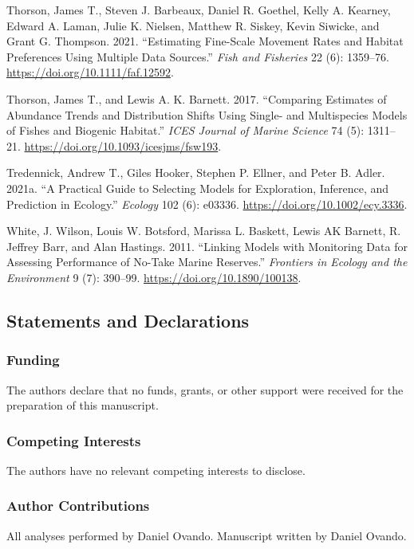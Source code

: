 \documentclass[
  default,
  lineno,
  referee]{sn-jnl}
\newlength{\cslhangindent}
\newenvironment{CSLReferences}[2] %
 {\begin{list}{}{%
  \setlength{\itemindent}{0pt}
  \setlength{\leftmargin}{0pt}
  \setlength{\parsep}{0pt}
  \ifodd #1
   \setlength{\leftmargin}{\cslhangindent}
   \setlength{\itemindent}{-1\cslhangindent}
  \fi
  \setlength{\itemsep}{#2\baselineskip}}}
 {\end{list}}
\begin{document}
\begin{CSLReferences}{1}{0}
Thorson, James T., Steven J. Barbeaux, Daniel R. Goethel, Kelly A.
Kearney, Edward A. Laman, Julie K. Nielsen, Matthew R. Siskey, Kevin
Siwicke, and Grant G. Thompson. 2021. {``Estimating Fine-Scale Movement
Rates and Habitat Preferences Using Multiple Data Sources.''} \emph{Fish
and Fisheries} 22 (6): 1359--76.
\url{https://doi.org/10.1111/faf.12592}.

Thorson, James T., and Lewis A. K. Barnett. 2017. {``Comparing Estimates
of Abundance Trends and Distribution Shifts Using Single- and
Multispecies Models of Fishes and Biogenic Habitat.''} \emph{ICES
Journal of Marine Science} 74 (5): 1311--21.
\url{https://doi.org/10.1093/icesjms/fsw193}.

Tredennick, Andrew T., Giles Hooker, Stephen P. Ellner, and Peter B.
Adler. 2021a. {``A Practical Guide to Selecting Models for Exploration,
Inference, and Prediction in Ecology.''} \emph{Ecology} 102 (6): e03336.
\url{https://doi.org/10.1002/ecy.3336}.


White, J. Wilson, Louis W. Botsford, Marissa L. Baskett, Lewis AK
Barnett, R. Jeffrey Barr, and Alan Hastings. 2011. {``Linking Models
with Monitoring Data for Assessing Performance of No-Take Marine
Reserves.''} \emph{Frontiers in Ecology and the Environment} 9 (7):
390--99. \url{https://doi.org/10.1890/100138}.

\end{CSLReferences}

\subsection{Statements and
Declarations}\label{statements-and-declarations}

\subsubsection{Funding}\label{funding}

The authors declare that no funds, grants, or other support were
received for the preparation of this manuscript.

\subsubsection{Competing Interests}\label{competing-interests}

The authors have no relevant competing interests to disclose.

\subsubsection{Author Contributions}\label{author-contributions}

All analyses performed by Daniel Ovando. Manuscript written by Daniel
Ovando.
\end{document}
